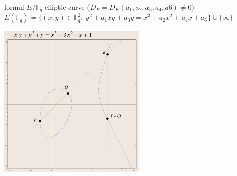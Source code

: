 \documentclass[handout]{beamer}%
\newcommand{\F}{\mathbb F}
\theoremstyle{definition}
\begin{document}
\begin{frame}
\begin{beamercolorbox}[shadow=true,left,rounded=true,wd=12cm]{formul}
$E/\F_q$ elliptic curve ($D_E=D_E(a_1,a_2,a_3,a_4,a6)\neq0$)\\
$E(\F_q)=\{(x,y)\in \F_q^2:\ y^2+a_1xy+a_3y=x^3+a_2x^2+a_4x+a_6\}\cup\{\infty\}$
\end{beamercolorbox}

\includegraphics[width=7cm]{images/add7.pdf}
\end{frame}
\end{document}
